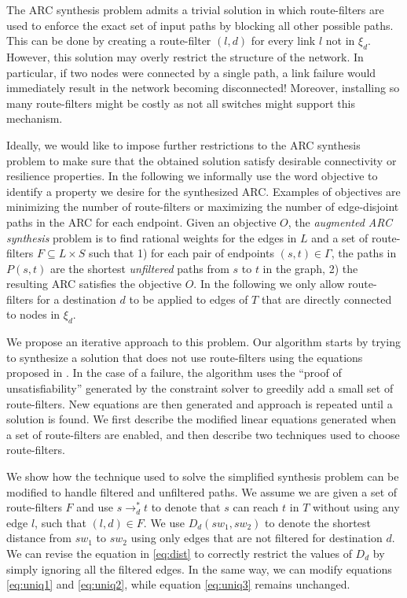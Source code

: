 The ARC synthesis problem admits a trivial solution in which 
route-filters are used to enforce the exact set of input paths by blocking all other possible paths.
This can be done by creating a 
route-filter $(l,d)$ for every link $l$ not in $\xi_d$. 
However, this solution may overly restrict the structure of the network.
In particular, if two nodes were connected by a single path,
a link failure would immediately result in the network becoming disconnected!
Moreover, installing so many route-filters might be costly as not all switches might
support this mechanism.

Ideally, we would like to impose further restrictions to the ARC
synthesis problem to make sure that the obtained solution
satisfy desirable connectivity or resilience properties.
In the following we informally use the word objective 
to identify a property we desire for the synthesized ARC.
Examples of objectives are minimizing the number of route-filters
or maximizing the number of edge-disjoint paths in the ARC
for each endpoint. 
Given an objective $O$, the \emph{augmented ARC synthesis} problem
is to find rational weights for the edges in $L$
and a set of route-filters $F\subseteq L\times S$
 such that 
1) for each pair of endpoints $(s,t) \in \Gamma$, 
the paths in $P(s,t)$ are the shortest \emph{unfiltered} paths from $s$ to $t$ 
in the graph,
2) the resulting ARC satisfies the objective $O$. 
In the following we only allow route-filters for a destination $d$ to be applied to edges of $T$ that are directly connected to 
nodes in $\xi_d$. 

We propose an iterative approach to this problem. 
Our algorithm starts by trying to synthesize a solution
that does not use route-filters using the equations proposed in . 
In the case of a failure, the algorithm uses the ``proof of unsatisfiability'' generated by the constraint solver 
to greedily add a small set of route-filters. New equations are then generated and approach is repeated until a solution is found.
We first describe the 
modified linear equations generated when a set of
route-filters are enabled, and then describe two
techniques used to choose route-filters. 

We show how the technique used to solve the simplified synthesis
problem can be modified to handle filtered and unfiltered paths.
We assume we are given a set of route-filters $F$ and 
use $s\rightarrow_d^* t$ to denote that $s$ can reach $t$
in $T$ without using any edge $l$, such that $(l,d)\in F$.
We use $D_d(sw_1, sw_2)$ to denote the shortest distance from $sw_1$ to $sw_2$
using only edges that are not filtered for destination $d$.
We can revise the equation in \eqref{eq:dist} to correctly restrict the values of $D_d$
by simply ignoring all the filtered edges. 
In the same way, we can modify equations  \eqref{eq:uniq1} and \eqref{eq:uniq2}, while
equation \eqref{eq:uniq3} remains unchanged.

